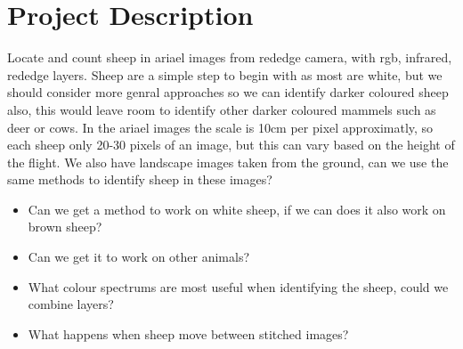 \documentclass[11pt,fleqn,twoside]{article}
\begin{document}

\mmp



\section{Project Description}
Locate and count sheep in ariael images from rededge camera, with rgb, infrared, rededge layers. 
Sheep are a simple step to begin with as most are white, but we should consider more genral approaches so we can identify darker coloured sheep also, 
this would leave room to identify other darker coloured mammels such as deer or cows.
In the ariael images the scale is 10cm per pixel approximatly, so each sheep only 20-30 pixels of an image, but this can vary based on the height of the flight.
We also have landscape images taken from the ground, can we use the same methods to identify sheep in these images?

\begin{itemize}
    \item Can we get a method to work on white sheep, if we can does it also work on brown sheep?
    \item Can we get it to work on other animals?
    \item What colour spectrums are most useful when identifying the sheep, could we combine layers?
    \item What happens when sheep move between stitched images?
\end{itemize}
 
\end{document}
